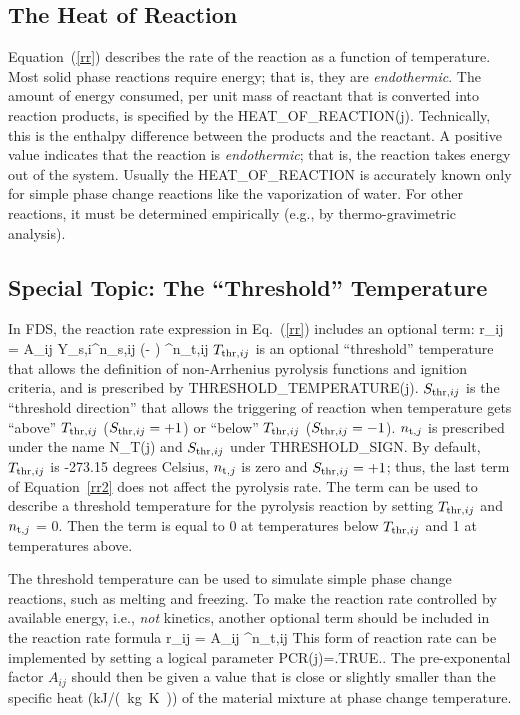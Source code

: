 \documentclass[11pt]{book}
\begin{document}
\subsection{The Heat of Reaction}

Equation~(\ref{rr}) describes the rate of the reaction as a function
of temperature.  Most solid phase reactions require energy; that is,
they are {\em endothermic}. The amount of energy consumed, per unit
mass of reactant that is converted into reaction products, is specified
by the {\ct HEAT\_OF\_REACTION(j)}. Technically, this is the enthalpy
difference between the products and the reactant. A positive value
indicates that the reaction is {\em endothermic}; that is, the
reaction takes energy out of the system. Usually the {\ct
HEAT\_OF\_REACTION} is accurately known only for simple phase change
reactions like the vaporization of water. For other reactions, it must
be determined empirically (e.g., by thermo-gravimetric analysis).


\subsection{Special Topic: The ``Threshold'' Temperature}

In FDS, the reaction rate expression in Eq.~(\ref{rr}) includes an optional term:
\be
  r_{ij} = A_{ij} \; Y_{{\rm s},i}^{n_{{\rm s},ij}} \; \exp \left(- \right) \;
  \max{}^{n_{{\rm t},ij}}
  \label{rr2}
\ee
$T_{{\rm thr},ij}$ is an optional ``threshold'' temperature that allows the definition of non-Arrhenius pyrolysis functions and ignition criteria, and is prescribed by {\ct THRESHOLD\_TEMPERATURE(j)}. $S_{{\rm thr},ij}$ is the ``threshold direction'' that allows the triggering of reaction when temperature gets ``above'' $T_{{\rm thr},ij}$ ($S_{{\rm thr},ij}=+1$) or ``below'' $T_{{\rm thr},ij}$ ($S_{{\rm thr},ij}=-1$). $n_{{\rm t},j}$ is prescribed under the name {\ct N\_T(j)} and $S_{{\rm thr},ij}$ under {\ct THRESHOLD\_SIGN}. By default, $T_{{\rm thr},ij}$ is -273.15 degrees Celsius, $n_{{\rm t},j}$ is zero and $S_{{\rm thr},ij}=+1$; thus, the last term of Equation~\ref{rr2} does not affect the pyrolysis rate. The term can be used to describe a threshold temperature for the pyrolysis reaction by setting $T_{{\rm thr},ij}$ and $n_{{\rm t},j}$ = 0. Then the term is equal to 0 at temperatures below $T_{{\rm thr},ij}$ and 1 at temperatures above.

The threshold temperature can be used to simulate simple phase change reactions, such as melting and freezing. To make the reaction rate controlled by available energy, i.e., {\em not} kinetics, another optional term should be included in the reaction rate formula
\be
  r_{ij} = A_{ij} \max{}^{n_{{\rm t},ij}}
  \label{rr3}
\ee
This form of reaction rate can be implemented by setting a logical parameter {\ct PCR(j)=.TRUE.}. The pre-exponental factor $A_{ij}$ should then be given a value that is close or slightly smaller than the specific heat (\si{kJ/(kg.K)}) of the material mixture at phase change temperature.
\end{document}
